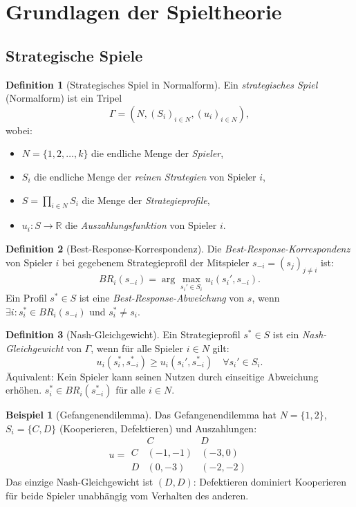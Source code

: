 ﻿\documentclass[a4paper,12pt]{article}
\theoremstyle{definition}
\newtheorem{definition}{Definition}
\newtheorem{beispiel}{Beispiel}
\begin{document}
\section{Grundlagen der Spieltheorie}

\subsection{Strategische Spiele}

\begin{definition}[Strategisches Spiel in Normalform]
Ein \emph{strategisches Spiel} (Normalform) ist ein Tripel
\[
\Gamma = (N, (S_i)_{i \in N}, (u_i)_{i \in N}),
\]
wobei:
\begin{itemize}
    \item $N = \{1, 2, \ldots, k\}$ die endliche Menge der \emph{Spieler},
    \item $S_i$ die endliche Menge der \emph{reinen Strategien} von Spieler $i$,
    \item $S = \prod_{i \in N} S_i$ die Menge der \emph{Strategieprofile},
    \item $u_i: S \to \mathbb{R}$ die \emph{Auszahlungsfunktion} von Spieler $i$.
\end{itemize}
\end{definition}

\begin{definition}[Best-Response-Korrespondenz]
\label{def:br}
Die \emph{Best-Response-Korrespondenz} von Spieler $i$ bei gegebenem
Strategieprofil der Mitspieler $s_{-i} = (s_j)_{j \neq i}$ ist:
\[
BR_i(s_{-i}) = \arg\max_{s_i' \in S_i} u_i(s_i', s_{-i}).
\]
Ein Profil $s^* \in S$ ist eine \emph{Best-Response-Abweichung} von $s$,
wenn $\exists i: s_i^* \in BR_i(s_{-i})$ und $s_i^* \neq s_i$.
\end{definition}

\begin{definition}[Nash-Gleichgewicht]
\label{def:nash}
Ein Strategieprofil $s^* \in S$ ist ein \emph{Nash-Gleichgewicht} von $\Gamma$,
wenn f\"ur alle Spieler $i \in N$ gilt:
\[
u_i(s_i^*, s_{-i}^*) \geq u_i(s_i', s_{-i}^*) \quad \forall s_i' \in S_i.
\]
\"Aquivalent: Kein Spieler kann seinen Nutzen durch einseitige Abweichung
erh\"ohen. $s_i^* \in BR_i(s_{-i}^*)$ f\"ur alle $i \in N$.
\end{definition}

\begin{beispiel}[Gefangenendilemma]
\label{bsp:pd}
Das Gefangenendilemma hat $N = \{1, 2\}$, $S_i = \{C, D\}$ (Kooperieren,
Defektieren) und Auszahlungen:
\[
u = \begin{array}{c|cc}
    & C & D \\ \hline
    C & (-1,-1) & (-3, 0) \\
    D & (0,-3)  & (-2,-2)
\end{array}
\]
Das einzige Nash-Gleichgewicht ist $(D,D)$: Defektieren dominiert Kooperieren
f\"ur beide Spieler unabh\"angig vom Verhalten des anderen.
\end{beispiel}
\end{document}
